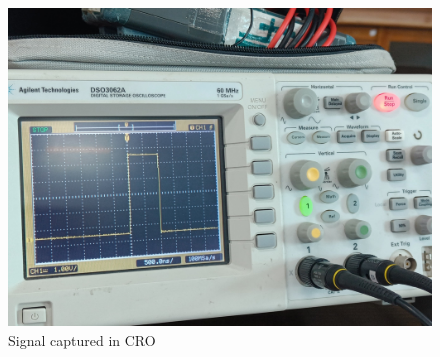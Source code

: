 \documentclass[journal]{IEEEtran}
\begin{document}
\begin{figure}[h!]
    \centering
    \includegraphics[width=0.7\columnwidth]{pics/WhatsApp Image 2025-01-23 at 13.22.10.jpeg}
    \caption{Signal captured in CRO}
\end{figure}
\end{document}
